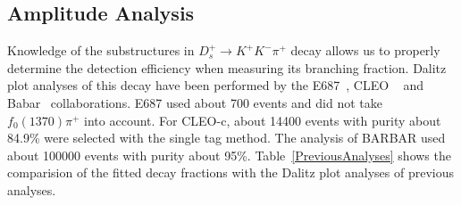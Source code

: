 \subsection{Amplitude Analysis}
\par{
    Knowledge of the substructures in $D_{s}^{+} \rightarrow K^{+}K^{-}\pi^{+}$ decay allows us to properly determine the detection efficiency when measuring its branching fraction.
    Dalitz plot analyses of this decay have been performed by the E687~\cite{E687RES}, CLEO ~\cite{2009CLEO} and Babar~\cite{2011BARBAR} collaborations.
    E687 used about 700 events and did not take $f_{0}(1370)\pi^{+}$ into account. 
    For CLEO-c, about 14400 events with purity about 84.9\% were selected with the single tag method.
    The analysis of BARBAR used about 100000 events with purity about 95\%. 
    Table~\ref{PreviousAnalyses} shows the comparision of the fitted decay fractions with the Dalitz plot analyses of previous analyses.
}

